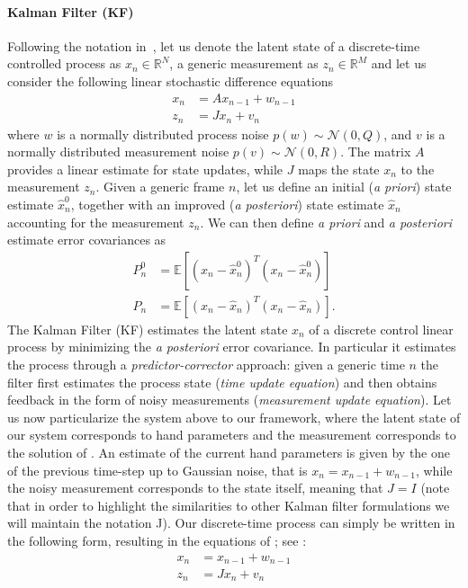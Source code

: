 \paragraph{Kalman Filter (KF)} 
Following the notation in~\cite{welch1995introduction}, let us denote the latent state of a discrete-time controlled process as $x_n \in \mathbb{R}^N$, a generic measurement as $z_n \in \mathbb{R}^M$ and let us consider the following linear stochastic difference equations
% 
\begin{align}
x_n &= A x_{n - 1} +  w_{n - 1} \\
z_n &= J x_n + v_n
\end{align}
% 
where $w$ is a normally distributed process noise $p(w) \sim \mathcal{N}(0, Q)$, and $v$ is a normally distributed measurement noise $p(v) \sim \mathcal{N}(0, R)$. The matrix $A$ provides a linear estimate for state updates, while $J$ maps the state $x_n$ to the measurement $z_n$.
Given a generic frame $n$, let us define an initial (\textit{a priori}) state estimate $\hat{x}_n^0$, together with an improved (\textit{a posteriori}) state estimate $\hat{x}_n$ accounting for the measurement $z_n$. 
We can then define \textit{a priori} and \textit{a posteriori} estimate error covariances as
% 
\begin{align}
	P_n^0 &= \mathbb{E}[(x_n - \hat{x}_n^0)^T(x_n - \hat{x}_n^0)]\\
	P_n   &= \mathbb{E}[(x_n - \hat{x}_n)^T(x_n - \hat{x}_n)].
\end{align}
%
The Kalman Filter (KF) estimates the latent state $x_n$ of a discrete control linear process by minimizing the \textit{a posteriori} error covariance. In particular it estimates the process through a \textit{predictor-corrector} approach: given a generic time $n$ the filter first estimates the process state (\textit{time update equation}) and then obtains feedback in the form of noisy measurements (\textit{measurement update equation}).
% 
Let us now particularize the system above to our framework, where the latent state of our system corresponds to hand parameters and the measurement corresponds to the solution of .
% 
An estimate of the current hand parameters is given by the one of the previous time-step up to Gaussian noise, that is $x_n = x_{n-1} + w_{n-1}$, while the noisy measurement corresponds to the state itself, meaning that $J = I$ (note that in order to highlight the similarities to other Kalman filter formulations we will maintain the notation J). Our discrete-time process can simply be written in the following form, resulting in the equations of ; see \cite{welch1995introduction}:
% 
\begin{align}
x_n &= x_{n - 1} + w_{n - 1} \\
z_n &= J x_n + v_n
\end{align}
% 
% 

%
